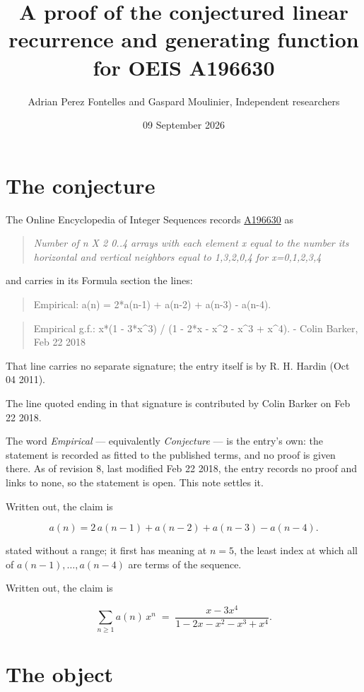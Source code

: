 \documentclass[11pt]{article}
\title{A proof of the conjectured linear recurrence and generating function for OEIS A196630}
\author{Adrian Perez Fontelles and Gaspard Moulinier, Independent researchers}
\date{09 September 2026}
\theoremstyle{definition}
\begin{document}
\maketitle
\section{The conjecture}

The Online Encyclopedia of Integer Sequences records \href{https://oeis.org/A196630}{A196630} as

\begin{quote}\itshape Number of n X 2 0..4 arrays with each element x equal to the number its horizontal and vertical neighbors equal to 1,3,2,0,4 for x=0,1,2,3,4\end{quote}

and carries in its Formula section the lines:

\begin{quote}\ttfamily Empirical: a(n) = 2*a(n-1) + a(n-2) + a(n-3) - a(n-4).\end{quote}

\begin{quote}\ttfamily Empirical g.f.: x*(1 - 3*x\textasciicircum{}3) / (1 - 2*x - x\textasciicircum{}2 - x\textasciicircum{}3 + x\textasciicircum{}4). - Colin Barker, Feb 22 2018\end{quote}

That line carries no separate signature; the entry itself is by R. H. Hardin (Oct 04 2011).

The line quoted ending in that signature is contributed by Colin Barker on Feb 22 2018.

The word {\itshape Empirical} --- equivalently {\itshape Conjecture} --- is the entry's own: the statement is recorded as fitted to the published terms, and no proof is given there. As of revision 8, last modified Feb 22 2018, the entry records no proof and links to none, so the statement is open. This note settles it.

Written out, the claim is

\[a(n) = 2\,a(n-1) + a(n-2) + a(n-3) - a(n-4).\]

stated without a range; it first has meaning at $n = 5$, the least index at which all of $a(n-1),\dots,a(n-4)$ are terms of the sequence.

Written out, the claim is

\[\sum_{n \ge 1} a(n)\,x^n \;=\; \frac{x - 3x^{4}}{1 - 2x - x^{2} - x^{3} + x^{4}}.\]

\section{The object}
\end{document}

